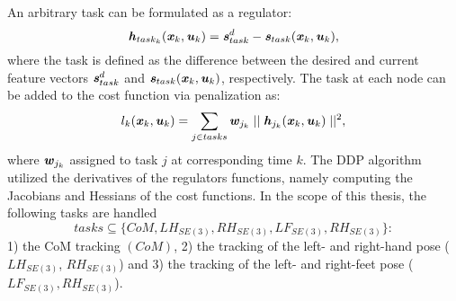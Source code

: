An arbitrary task can be formulated as a regulator: 
\begin{equation*} 
\bm{\mathit{h}}_{task_k}(\bm{\mathit{x}}_k,\bm{\mathit{u}}_k)=\bm{\mathit{s}}_{task}^d-\bm{\mathit{s}}_{task}(\bm{\mathit{x}}_k,\bm{\mathit{u}}_k),
\end{equation*}   
where the task is defined as the difference between the desired and current feature vectors $\bm{\mathit{s}}_{task}^d$ and $\bm{\mathit{s}}_{task}(\bm{\mathit{x}}_k,\bm{\mathit{u}}_k)$, respectively. The task at each node can be added to the cost function via penalization as: 
\begin{equation*} 
l_k(\bm{\mathit{x}}_k,\bm{\mathit{u}}_k)=\sum_{j\in tasks}\bm{\mathit{w}}_{j_k}\mid\mid\bm{\mathit{h}}_{j_k}(\bm{\mathit{x}}_k,\bm{\mathit{u}}_k)\mid\mid^2,
\end{equation*}  
where $\bm{\mathit{w}}_{j_k}$ assigned to task $j$ at corresponding time $k$. The \gls{DDP} algorithm utilized the derivatives of the regulators functions, namely computing the Jacobians and Hessians of the cost functions. 
In the scope of this thesis, the following tasks are handled
\begin{equation}
tasks \subseteq \{CoM, LH_{SE(3)}, RH_{SE(3)}, LF_{SE(3)}, RH_{SE(3)}\}:
\end{equation}
1) the \gls{CoM} tracking $(CoM)$, 2) the tracking of the left- and right-hand pose ($LH_{SE(3)}$, $RH_{SE(3)}$) and 3) the tracking of the left- and right-feet pose ($LF_{SE(3)}, RH_{SE(3)}$).
